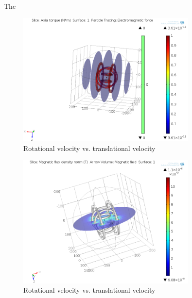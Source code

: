 \documentclass[12pt,a4paper,titlepage]{report}
\begin{document}
The 


\begin{figure}
  \centering
    \includegraphics[width=0.80\textwidth]{force_torque}
  \caption[Rotational velocity vs. translational velocity]{Rotational velocity vs. translational velocity}
  \label{Rotational velocity vs. translational velocity}
\end{figure}




\begin{figure}
  \centering
    \includegraphics[width=0.80\textwidth]{magnetic_field.png}
  \caption[Rotational velocity vs. translational velocity]{Rotational velocity vs. translational velocity}
  \label{Rotational velocity vs. translational velocity}
\end{figure}
\end{document}
